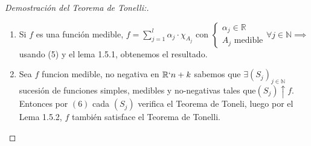\begin{proof}[Demostración del Teorema de Tonelli:]
\begin{enumerate}
\item Si $f$ es una función medible, $f = \sum_{j = 1}^l \alpha_j \cdot \chi_{A_j}$
con $\begin{cases}
        \alpha_j \in \mathbb{R} \\
        A_j \text{ medible}
    \end{cases} \forall j \in \mathbb{N} \implies$ usando (5) y el lema 1.5.1, obtenemos el resultado.

\item Sea $f$ funcion medible, no negativa en $\mathbb{R}`{n+k}$ sabemos que $\exists
    (S_j)_{j \in \mathbb{N}}$ sucesión de funciones simples, medibles y
no-negativas tales que$(S_j) \uparrow f$. Entonces por $(6)$ cada $(S_j)$
verifica el Teorema de Toneli, luego por el Lema 1.5.2, $f$ también satisface
el Teorema de Tonelli.
\end{enumerate}
\end{proof}

